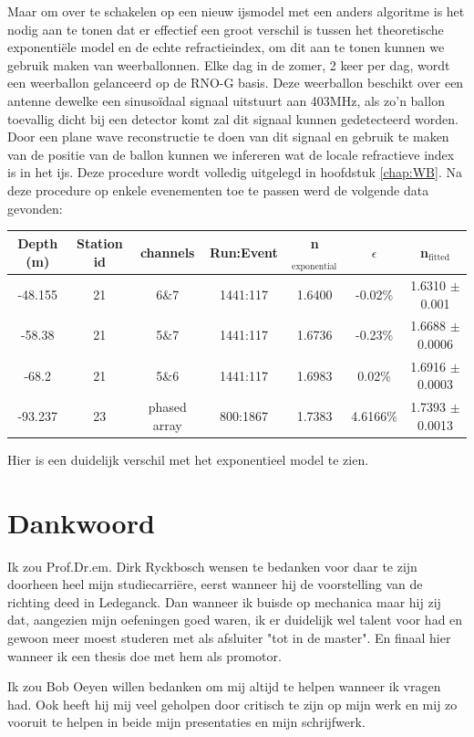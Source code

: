 \documentclass[11pt,a4paper,faculty=we,language=en,doctype=report]{cls/ugent-doc}
\begin{document}
Maar om over te schakelen op een nieuw ijsmodel met een anders algoritme is het nodig aan te tonen dat er effectief
een groot verschil is tussen het theoretische exponentiële model en de echte refractieindex, om dit aan te tonen 
kunnen we gebruik maken van weerballonnen. Elke dag in de zomer, 2 keer per dag, wordt een weerballon gelanceerd 
op de RNO-G basis. 
Deze weerballon beschikt over een antenne dewelke een sinusoïdaal signaal uitstuurt aan 403MHz, als zo'n ballon toevallig
dicht bij een detector komt zal dit signaal kunnen gedetecteerd worden. Door een plane wave reconstructie te doen
van dit signaal en gebruik te maken van de positie van de ballon kunnen we infereren wat de locale refractieve index
is in het ijs. Deze procedure wordt volledig uitgelegd in hoofdstuk \ref{chap:WB}.
Na deze procedure op enkele evenementen toe te passen werd de volgende data gevonden:
\begin{center}
\begin{tabular}{||c c c c c c c||}
 \hline
 Depth (m) & Station id & channels & Run:Event & n$_\text{exponential}$ & $\epsilon$ & n$_\text{fitted}$\\ [0.5ex]
 \hline\hline
-48.155 & 21 & 6\&7 & 1441:117 & 1.6400 & -0.02\% & 1.6310 $\pm$ 0.001 \\
 -58.38 & 21 & 5\&7 & 1441:117 & 1.6736 & -0.23\% & 1.6688 $\pm$ 0.0006 \\
 -68.2 & 21 & 5\&6 & 1441:117 & 1.6983 & 0.02\% & 1.6916 $\pm$ 0.0003 \\
 -93.237 & 23 & phased array & 800:1867 & 1.7383 & 4.6166\% & 1.7393 $\pm$ 0.0013 \\
 \hline
\end{tabular}
\end{center}
Hier is een duidelijk verschil met het exponentieel model te
zien.
\newpage
\chapter*{Dankwoord}
Ik zou Prof.Dr.em. Dirk Ryckbosch wensen te bedanken voor daar te
zijn doorheen heel mijn studiecarriëre, eerst wanneer hij de
voorstelling van de richting deed in Ledeganck. Dan wanneer ik
buisde op mechanica maar hij zij dat, aangezien mijn oefeningen goed
waren, ik er duidelijk wel talent voor had en gewoon meer moest
studeren met als afsluiter "tot in de master". En finaal hier
wanneer ik een thesis doe met hem als promotor.

Ik zou Bob Oeyen willen bedanken om mij altijd te helpen wanneer ik
vragen had. Ook heeft hij mij veel geholpen door critisch te zijn op
mijn werk en mij zo vooruit te helpen in beide mijn presentaties en
mijn schrijfwerk.
\end{document}

